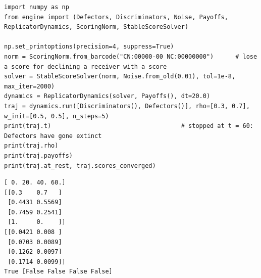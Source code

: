 \begin{lstlisting}[style=code]
import numpy as np
from engine import (Defectors, Discriminators, Noise, Payoffs, ReplicatorDynamics, ScoringNorm, StableScoreSolver)

np.set_printoptions(precision=4, suppress=True)
norm = ScoringNorm.from_barcode("CN:00000-00 NC:00000000")      # lose a score for declining a receiver with a score
solver = StableScoreSolver(norm, Noise.from_old(0.01), tol=1e-8, max_iter=2000)
dynamics = ReplicatorDynamics(solver, Payoffs(), dt=20.0)
traj = dynamics.run([Discriminators(), Defectors()], rho=[0.3, 0.7], w_init=[0.5, 0.5], n_steps=5)
print(traj.t)                                    # stopped at t = 60: Defectors have gone extinct
print(traj.rho)
print(traj.payoffs)
print(traj.at_rest, traj.scores_converged)
\end{lstlisting}
\begin{lstlisting}[style=output]
[ 0. 20. 40. 60.]
[[0.3    0.7   ]
 [0.4431 0.5569]
 [0.7459 0.2541]
 [1.     0.    ]]
[[0.0421 0.008 ]
 [0.0703 0.0089]
 [0.1262 0.0097]
 [0.1714 0.0099]]
True [False False False False]
\end{lstlisting}
